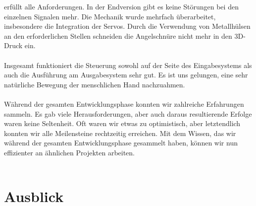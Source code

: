 \documentclass[titlepage,12pt,twoside]{article}
\begin{document}
erfüllt alle Anforderungen. In der Endversion gibt es keine Störungen bei den 
einzelnen Signalen mehr. Die Mechanik wurde mehrfach überarbeitet, insbesondere 
die Integration der Servos. Durch die Verwendung von Metallhülsen an den erforderlichen 
Stellen schneiden die Angelschnüre nicht mehr in den 3D-Druck ein. \\
\\
Insgesamt funktioniert die Steuerung sowohl auf der Seite des Eingabesystems 
als auch die Ausführung am Ausgabesystem sehr gut. Es ist uns gelungen, eine 
sehr natürliche Bewegung der menschlichen Hand nachzuahmen. \\
\\
Während der gesamten Entwicklungsphase konnten wir zahlreiche Erfahrungen 
sammeln. Es gab viele Herausforderungen, aber auch daraus resultierende 
Erfolge waren keine Seltenheit. Oft waren wir etwas zu optimistisch, aber 
letztendlich konnten wir alle Meilensteine rechtzeitig erreichen. Mit dem 
Wissen, das wir während der gesamten Entwicklungsphase gesammelt haben, können
 wir nun effizienter an ähnlichen Projekten arbeiten. \\
 \\

\newpage
\section{Ausblick}
\end{document}
